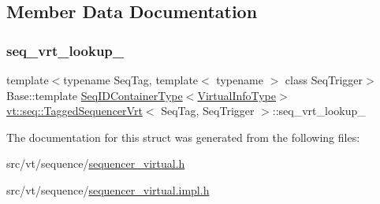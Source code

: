 \subsection{Member Data Documentation}
\mbox{\label{structvt_1_1seq_1_1_tagged_sequencer_vrt_a213529bb66256be822694bb39d7cce0f}} 
\subsubsection{\texorpdfstring{seq\+\_\+vrt\+\_\+lookup\+\_\+}{seq\_vrt\_lookup\_}}
{\footnotesize\ttfamily template$<$typename Seq\+Tag, template$<$ typename $>$ class Seq\+Trigger$>$ \\
Base\+::template \hyperlink{structvt_1_1seq_1_1_tagged_sequencer_a718515267468123a9036c30033d74237}{Seq\+I\+D\+Container\+Type}$<$\hyperlink{structvt_1_1seq_1_1_tagged_sequencer_vrt_a19c5f10f5710fee8cd202735af8aa17f}{Virtual\+Info\+Type}$>$ \hyperlink{structvt_1_1seq_1_1_tagged_sequencer_vrt}{vt\+::seq\+::\+Tagged\+Sequencer\+Vrt}$<$ Seq\+Tag, Seq\+Trigger $>$\+::seq\+\_\+vrt\+\_\+lookup\+\_\+\hspace{0.3cm}{\ttfamily [private]}}



The documentation for this struct was generated from the following files\+:\begin{DoxyCompactItemize}
\item 
src/vt/sequence/\hyperlink{sequencer__virtual_8h}{sequencer\+\_\+virtual.\+h}\item 
src/vt/sequence/\hyperlink{sequencer__virtual_8impl_8h}{sequencer\+\_\+virtual.\+impl.\+h}\end{DoxyCompactItemize}
